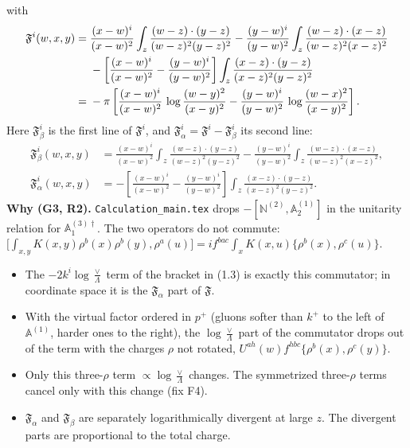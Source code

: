 \documentclass[9pt]{article}
\numberwithin{equation}{section}
\begin{document}
with
\begin{align}
\mathfrak{F}^{i}(w,x,y) ={}& \frac{(x-w)^{i}}{(x-w)^{2}}\int_{z}\frac{(w-z)\cdot(y-z)}{(w-z)^{2}(y-z)^{2}}
-\frac{(y-w)^{i}}{(y-w)^{2}}\int_{z}\frac{(w-z)\cdot(x-z)}{(w-z)^{2}(x-z)^{2}}\notag\\
&-\left[\frac{(x-w)^{i}}{(x-w)^{2}}-\frac{(y-w)^{i}}{(y-w)^{2}}\right]\int_{z}\frac{(x-z)\cdot(y-z)}{(x-z)^{2}(y-z)^{2}}\\
={}& -\pi\left[\frac{(x-w)^{i}}{(x-w)^{2}}\,\log\frac{(w-y)^{2}}{(x-y)^{2}}-\frac{(y-w)^{i}}{(y-w)^{2}}\,\log\frac{(w-x)^{2}}{(x-y)^{2}}\right].
\end{align}
\begingroup\color{blue}\noindent Here $\mathfrak{F}^{i}_{\beta}$ is the first line of $\mathfrak{F}^{i}$, and $\mathfrak{F}^{i}_{\alpha}=\mathfrak{F}^{i}-\mathfrak{F}^{i}_{\beta}$ its second line:
\begin{align*}
\mathfrak{F}^{i}_{\beta}(w,x,y)&=\frac{(x-w)^{i}}{(x-w)^{2}}\int_{z}\frac{(w-z)\cdot(y-z)}{(w-z)^{2}(y-z)^{2}}-\frac{(y-w)^{i}}{(y-w)^{2}}\int_{z}\frac{(w-z)\cdot(x-z)}{(w-z)^{2}(x-z)^{2}},\\
\mathfrak{F}^{i}_{\alpha}(w,x,y)&=-\left[\frac{(x-w)^{i}}{(x-w)^{2}}-\frac{(y-w)^{i}}{(y-w)^{2}}\right]\int_{z}\frac{(x-z)\cdot(y-z)}{(x-z)^{2}(y-z)^{2}}.
\end{align*}
\textbf{Why (G3, R2).} \texttt{Calculation\_main.tex} drops $-[\mathbb{N}^{(2)},\mathbb{A}^{(1)}_{2}]$ in the unitarity relation for $\mathbb{A}^{(3)\dagger}_{1}$. The two operators do not commute: $\big[\int_{x,y}K(x,y)\rho^{b}(x)\rho^{b}(y),\rho^{a}(u)\big]=if^{bac}\int_{x}K(x,u)\{\rho^{b}(x),\rho^{c}(u)\}$.
\begin{itemize}
\item The $-2k^{i}\log\frac{\vee}{\Lambda}$ term of the bracket in (1.3) is exactly this commutator; in coordinate space it is the $\mathfrak{F}_{\alpha}$ part of $\mathfrak{F}$.
\item With the virtual factor ordered in $p^{+}$ (gluons softer than $k^{+}$ to the left of $\mathbb{A}^{(1)}$, harder ones to the right), the $\log\frac{\vee}{\Lambda}$ part of the commutator drops out of the term with the charges $\rho$ not rotated, $U^{ah}(w)f^{hbc}\{\rho^{b}(x),\rho^{c}(y)\}$.
\item Only this three-$\rho$ term $\propto\log\frac{\vee}{\Lambda}$ changes. The symmetrized three-$\rho$ terms cancel only with this change (fix F4).
\item $\mathfrak{F}_{\alpha}$ and $\mathfrak{F}_{\beta}$ are separately logarithmically divergent at large $z$. The divergent parts are proportional to the total charge.
\end{itemize}\par\endgroup
\end{document}
